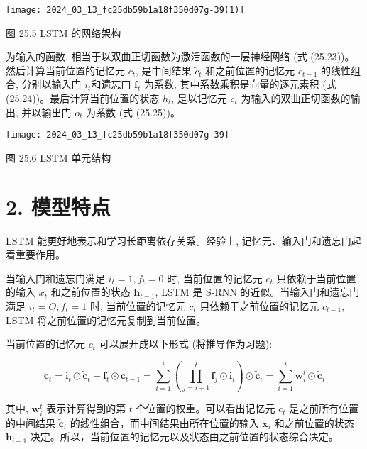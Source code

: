 \documentclass[10pt]{article}
\begin{document}
\begin{center}
\texttt{[image: 2024\_03\_13\_fc25db59b1a18f350d07g-39(1)]}
\end{center}

图 25.5 LSTM 的网络架构

为输入的函数, 相当于以双曲正切函数为激活函数的一层神经网络 (式 (25.23))。然后计算当前位置的记忆元 $c_{t}$, 是中间结果 $\tilde{c}_{t}$ 和之前位置的记忆元 $c_{t-1}$ 的线性组合, 分别以输入门 $i_{t}$和遗忘门 $\boldsymbol{f}_{t}$ 为系数, 其中系数乘积是向量的逐元素积 (式 (25.24))。最后计算当前位置的状态 $h_{t}$, 是以记忆元 $c_{t}$ 为输入的双曲正切函数的输出, 并以输出门 $o_{t}$ 为系数 (式 (25.25))。

\begin{center}
\texttt{[image: 2024\_03\_13\_fc25db59b1a18f350d07g-39]}
\end{center}

图 25.6 LSTM 单元结构

\section*{2. 模型特点}
LSTM 能更好地表示和学习长距离依存关系。经验上, 记忆元、输入门和遗忘门起着重要作用。

当输入门和遗忘门满足 $i_{t}=1, f_{t}=0$ 时, 当前位置的记忆元 $c_{t}$ 只依赖于当前位置的输入 $x_{t}$ 和之前位置的状态 $\boldsymbol{h}_{t-1}$, LSTM 是 S-RNN 的近似。当输入门和遗忘门满足 $i_{t}=O, f_{t}=1$ 时, 当前位置的记忆元 $c_{t}$ 只依赖于之前位置的记忆元 $c_{t-1}$, LSTM 将之前位置的记忆元复制到当前位置。

当前位置的记忆元 $c_{t}$ 可以展开成以下形式 (将推导作为习题):


\begin{equation*}
\boldsymbol{c}_{t}=\boldsymbol{i}_{t} \odot \tilde{\boldsymbol{c}}_{t}+\boldsymbol{f}_{t} \odot \boldsymbol{c}_{t-1}=\sum_{i=1}^{t}\left(\prod_{j=i+1}^{t} \boldsymbol{f}_{j} \odot \boldsymbol{i}_{i}\right) \odot \tilde{\boldsymbol{c}}_{i}=\sum_{i=1}^{t} \boldsymbol{w}_{i}^{t} \odot \tilde{\boldsymbol{c}}_{i} \tag{25.26}
\end{equation*}


其中, $\boldsymbol{w}_{i}^{t}$ 表示计算得到的第 $t$ 个位置的权重。可以看出记忆元 $c_{t}$ 是之前所有位置的中间结果 $\tilde{\boldsymbol{c}}_{i}$ 的线性组合，而中间结果由所在位置的输入 $\boldsymbol{x}_{i}$ 和之前位置的状态 $\boldsymbol{h}_{i-1}$ 决定。所以，当前位置的记忆元以及状态由之前位置的状态综合决定。
\end{document}
